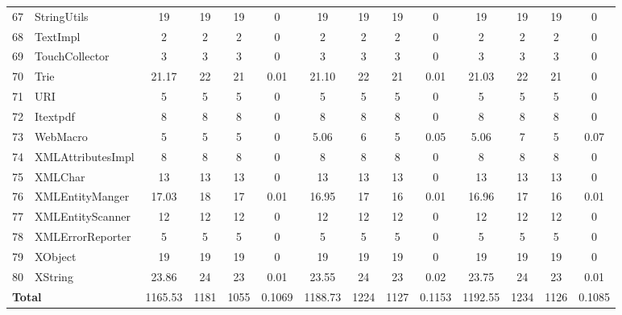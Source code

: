 \documentclass[conference]{IEEEtran}
\begin{document}
\begin{table} [ht!]
{\begin{tabular}{c l c c c c c c c c c c c c}
 67						& StringUtils					&19 	&	19	&	19	& 		0					& 19		& 19 		& 19		& 		0			& 19			& 19			& 19			&	0\\      
 68						& TextImpl					& 2 	&	2	&	2	& 		0					& 2		&  2		& 2		& 		0			& 2			& 2			& 2			&	0\\      
 69						& TouchCollector				& 3	&	3	&	3	& 		0					& 3		&  3		& 3		& 		0			& 3			& 3			& 3			&	0\\      
 70						& Trie						& 21.17&	22	&	21	& 		0.01					& 21.10	&  22		& 21		& 		0.01			& 21.03		& 22			& 21			&	0\\      
 71						& URI						& 5 	&	5	&	5	& 		0					& 5		&  5		& 5		& 		0			& 5			& 5			& 5			&	0\\      
 72						& Itextpdf						& 8	&	8	&	8	& 		0					& 8		&  8		& 8		& 		0			& 8			& 8			& 8			&	0\\      
 73						& WebMacro					& 5	&	5	&	5	& 		0					& 5.06	&  6		& 5		& 		0.05			& 5.06		& 7			& 5			&	0.07\\      
 74						& XMLAttributesImpl				& 8	&	8	&	8	& 		0					& 8		&  8		& 8		& 		0			& 8			& 8			& 8			&	0\\      
 75						& XMLChar					& 13	&	13	&	13	& 		0					& 13		&  13		& 13		& 		0			& 13			& 13			& 13			&	0\\      
 76						& XMLEntityManger				& 17.03&	18	&	17	& 		0.01					& 16.95	&  17		& 16		& 		0.01			& 16.96		& 17			& 16			&	0.01\\      
 77						& XMLEntityScanner				& 12	&	12	&	12	& 		0					& 12		&  12		& 12		& 		0			& 12			& 12			& 12			&	0\\      
 78						& XMLErrorReporter				& 5	&	5	&	5	& 		0					& 5		&  5		& 5		& 		0			& 5			& 5			& 5			&	0\\      
 79						& XObject						& 19	&	19	&	19	& 		0					& 19		&  19		& 19		& 		0			& 19			& 19			& 19			&	0\\      
 80						& XString						& 23.86&	24	&	23	& 		0.01					& 23.55	&  24		& 23		& 		0.02			& 23.75		& 24			& 23			&	0.01\\      
    						\multicolumn{2}{l}{\textbf{Total}}						&1165.53	& 1181	&    1055	&		0.1069					& 1188.73		&	1224	&	1127	&	0.1153			& 1192.55		& 1234		& 1126		& 	0.1085\\
     \end{tabular}
    \label{table:Results}
     }
     \end{table}
\end{document}
